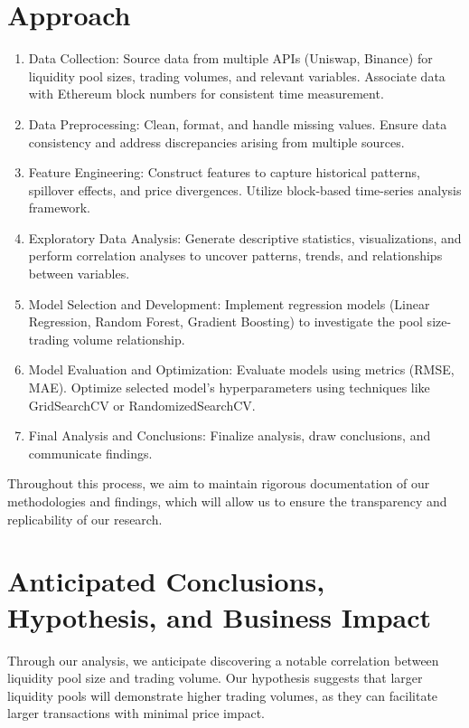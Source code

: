 \documentclass{article}
\begin{document}
{\section*{Approach}
\begin{enumerate}[itemsep=0pt, topsep=0pt]
\item Data Collection: Source data from multiple APIs (Uniswap, Binance) for liquidity pool sizes, trading volumes, and relevant variables. Associate data with Ethereum block numbers for consistent time measurement.
\item Data Preprocessing: Clean, format, and handle missing values. Ensure data consistency and address discrepancies arising from multiple sources.
\item Feature Engineering: Construct features to capture historical patterns, spillover effects, and price divergences. Utilize block-based time-series analysis framework.
\item Exploratory Data Analysis: Generate descriptive statistics, visualizations, and perform correlation analyses to uncover patterns, trends, and relationships between variables.
\item Model Selection and Development: Implement regression models (Linear Regression, Random Forest, Gradient Boosting) to investigate the pool size-trading volume relationship.
\item Model Evaluation and Optimization: Evaluate models using metrics (RMSE, MAE). Optimize selected model's hyperparameters using techniques like GridSearchCV or RandomizedSearchCV.
\item Final Analysis and Conclusions: Finalize analysis, draw conclusions, and communicate findings.
\end{enumerate}

Throughout this process, we aim to maintain rigorous documentation of our methodologies and findings, which will allow us to ensure the transparency and replicability of our research.

\section*{Anticipated Conclusions, Hypothesis, and Business Impact}

Through our analysis, we anticipate discovering a notable correlation between liquidity pool size and trading volume. Our hypothesis suggests that larger liquidity pools will demonstrate higher trading volumes, as they can facilitate larger transactions with minimal price impact.

}
\end{document}
